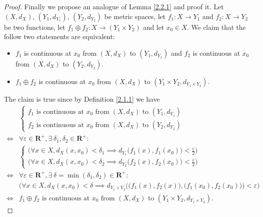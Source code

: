 \begin{proof}
    Finally we propose an analogue of Lemma \ref{2.2.1} and proof it.
    Let \((X, d_X)\), \((Y_1, d_{Y_1})\), \((Y_2, d_{Y_2})\) be metric spaces, let \(f_1 : X \to Y_1\) and \(f_2 : X \to Y_2\) be two functions, let \(f_1 \oplus f_2 : X \to (Y_1 \times Y_2)\) and let \(x_0 \in X\).
    We claim that the follow two statements are equivalent:
    \begin{itemize}
        \item \(f_1\) is continuous at \(x_0\) from \((X, d_X)\) to \((Y_1, d_{Y_1})\) and \(f_2\) is continuous at \(x_0\) from \((X, d_X)\) to \((Y_2, d_{Y_2})\).
        \item \(f_1 \oplus f_2\) is continuous at \(x_0\) from \((X, d_X)\) to \((Y_1 \times Y_2, d_{Y_1 \times Y_2})\).
    \end{itemize}
    The claim is true since by Definition \ref{2.1.1} we have
    \begin{align*}
             & \begin{cases}
                   f_1 \text{ is continuous at } x_0 \text{ from } (X, d_X) \text{ to } (Y_1, d_{Y_1}) \\
                   f_2 \text{ is continuous at } x_0 \text{ from } (X, d_X) \text{ to } (Y_2, d_{Y_2})
               \end{cases}                                                                   \\
        \iff & \forall \varepsilon \in \mathbf{R}^+, \exists\ \delta_1, \delta_2 \in \mathbf{R}^+ :                                                                  \\
             & \begin{cases}
                   \big(\forall x \in X, d_X(x, x_0) < \delta_1 \implies d_{Y_1}\big(f_1(x), f_1(x_0)\big) < \frac{\varepsilon}{2}) \\
                   \big(\forall x \in X, d_X(x, x_0) < \delta_2 \implies d_{Y_2}\big(f_2(x), f_2(x_0)\big) < \frac{\varepsilon}{2})
               \end{cases}                                      \\
        \iff & \forall \varepsilon \in \mathbf{R}^+, \exists\ \delta = \min(\delta_1, \delta_2) \in \mathbf{R}^+ :                                                   \\
             & \big(\forall x \in X, d_X(x, x_0) < \delta \implies d_{Y_1 \times Y_2}\Big(\big(f_1(x), f_2(x)\big), \big(f_1(x_0), f_2(x_0)\big)\Big) < \varepsilon) \\
        \iff & f_1 \oplus f_2 \text{ is continuous at } x_0 \text{ from } (X, d_X) \text{ to } (Y_1 \times Y_2, d_{Y_1 \times Y_2}).
    \end{align*}
\end{proof}

